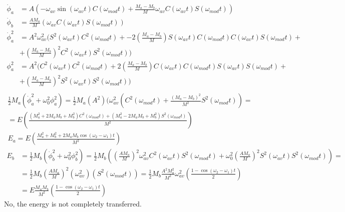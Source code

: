 \documentclass[twoside,10pt]{amsart}
\begin{document}
\[
\begin{aligned}
  \dot{\phi}_a & = A (-\omega_{av} \sin{ (\omega_{av} t ) } C(\omega_{mod} t ) + \frac{ M_a - M_b}{M} \omega_{av} C(\omega_{av} t ) S(\omega_{mod} t ) ) \\
  \dot{\phi}_b & = \frac{ A M_a}{M} (\omega_{av} C(\omega_{av} t ) S(\omega_{mod}t ) )  \\
  \dot{\phi}_a^2 & = A^2 \omega_{av}^2 ( S^2(\omega_{av} t ) C^2 (\omega_{mod} t ) + - 2 \left( \frac{M_a - M_b}{M} \right) S(\omega_{av} t ) C(\omega_{mod}t ) C(\omega_{av} t ) S(\omega_{mod} t) + \\
  & + \left( \frac{M_a - M_b}{M} \right)^2 C^2 (\omega_{av} t ) S^2(\omega_{mod}t ) ) \\
  \phi_a^2 & = A^2 ( C^2(\omega_{av} t ) C^2 (\omega_{mod} t ) +  2 \left( \frac{M_a - M_b}{M} \right) C(\omega_{av} t ) C(\omega_{mod}t ) S(\omega_{av} t ) S(\omega_{mod} t) + \\
& + \left( \frac{M_a - M_b}{M} \right)^2 S^2 (\omega_{av} t ) S^2(\omega_{mod}t ) ) \\
\end{aligned}
\]
\[
\begin{gathered}
  \frac{1}{2} M_a (\dot{\phi}_a^2 + \omega_0^2 \phi_a^2 ) = \frac{1}{2} M_a (A^2) ( \omega_{av}^2 (C^2(\omega_{mod} t) + \frac{ (M_a - M_b)^2 }{M^2} S^2 (\omega_{mod} t) ) =  \\
  = E \left( \frac{ (M_a^2 + 2M_a M_b + M_b^2 ) C^2( \omega_{mod} t ) + (M_a^2 - 2 M_a M_b + M_b^2 ) S^2(\omega_{mod} t) }{ M^2}\right) \\
  \boxed{ E_a  = E \left( \frac{ M_a^2 + M_b^2 + 2 M_a M_b \cos{ (\omega_2 - \omega_1 )t } }{ M^2 } \right) }
\end{gathered}
\]
\[
\begin{aligned}
  E_b & = \frac{1}{2} M_b (\dot{\phi}_b^2 + \omega_0^2 \phi_b^2 ) = \frac{1}{2} M_b ( \left( \frac{AM_a}{M} \right)^2 \omega_{av}^2 C^2(\omega_{av} t ) S^2(\omega_{mod}t) + \omega_0^2 \left( \frac{AM_a}{M} \right)^2 S^2(\omega_{av} t) S^2(\omega_{mod} t) ) = \\
  & = \frac{1}{2} M_b \left( \frac{AM_a}{M} \right)^2 (\omega_{av}^2 ) (S^2(\omega_{mod} t ) ) = \frac{1}{2} M_b \frac{ A^2 M_a^2 }{ M^2 } \omega_{av}^2 \left( \frac{1 - \cos{ (\omega_2 - \omega_1 ) t } }{2 } \right) \\
  & = E \frac{M_a M_b}{M^2} \left( \frac{1 - \cos{ (\omega_2 - \omega_1 ) t } }{ 2 } \right) 
\end{aligned}
\]
No, the energy is not completely transferred.  
\end{document}
